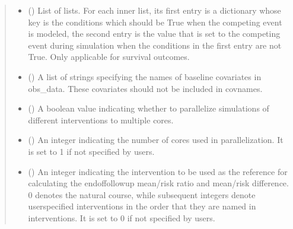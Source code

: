 \documentclass[letterpaper,10pt,english]{sphinxmanual}
\begin{document}
\begin{fulllineitems}
\begin{quote}
\begin{description}
\begin{itemize}
\item {} 
\sphinxAtStartPar
{} (\sphinxstyleliteralemphasis{\sphinxupquote{, }}) \textendash{} List of lists. For each inner list, its first entry is a dictionary whose key is the conditions which
should be True when the competing event is modeled, the second entry is the value that is set to the competing
event during simulation when the conditions in the first entry are not True. Only applicable for survival outcomes.

\item {} 
\sphinxAtStartPar
{} (\sphinxstyleliteralemphasis{\sphinxupquote{, }}) \textendash{} A list of strings specifying the names of baseline covariates in obs\_data. These covariates should not be
included in covnames.

\item {} 
\sphinxAtStartPar
{} (\sphinxstyleliteralemphasis{\sphinxupquote{, }}) \textendash{} A boolean value indicating whether to parallelize simulations of different interventions to multiple cores.

\item {} 
\sphinxAtStartPar
{} (\sphinxstyleliteralemphasis{\sphinxupquote{, }}) \textendash{} An integer indicating the number of cores used in parallelization. It is set to 1 if not specified by users.

\item {} 
\sphinxAtStartPar
{} (\sphinxstyleliteralemphasis{\sphinxupquote{, }}) \textendash{} An integer indicating the intervention to be used as the reference for calculating the end\sphinxhyphen{}of\sphinxhyphen{}follow\sphinxhyphen{}up mean/risk
ratio and mean/risk difference. 0 denotes the natural course, while subsequent integers denote user\sphinxhyphen{}specified
interventions in the order that they are named in interventions. It is set to 0 if not specified by users.


\end{itemize}
\end{description}
\end{quote}
\end{fulllineitems}
\end{document}
